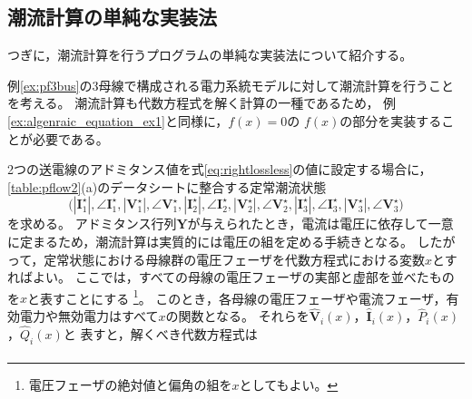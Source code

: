 \documentclass[tombow,dvipdfmx]{corona-a5-1.1}
\begin{document}
\subsection{潮流計算の単純な実装法}

つぎに，潮流計算を行うプログラムの単純な実装法について紹介する。
\begin{例}[潮流計算の実装法]\label{ex:simplepowerflow}
例\ref{ex:pf3bus}の3母線で構成される電力系統モデルに対して潮流計算を行うことを考える。
潮流計算も代数方程式を解く計算の一種であるため，
例\nobreak\ref{ex:algenraic_equation_ex1}と同様に，$f(x)=0$の
$f(x)$の部分を実装することが必要である。

2つの送電線のアドミタンス値を式\ref{eq:rightlossless}の値に設定する場合に，\ref{table:pflow2}(a)のデータシートに整合する定常潮流状態
\[
\bigl(
|\bm{I}_1^{\star}|,\angle \bm{I}_1^{\star},
|\bm{V}_1^{\star}|,\angle \bm{V}_1^{\star},
|\bm{I}_2^{\star}|,\angle \bm{I}_2^{\star},
|\bm{V}_2^{\star}|,\angle \bm{V}_2^{\star},
|\bm{I}_3^{\star}|,\angle \bm{I}_3^{\star},
|\bm{V}_3^{\star}|,\angle \bm{V}_3^{\star}
\bigr)
\]
を求める。
アドミタンス行列$\bm Y$が与えられたとき，電流は電圧に依存して一意に定まるため，潮流計算は実質的には電圧の組を定める手続きとなる。
したがって，定常状態における母線群の電圧フェーザを代数方程式における変数$x$とすればよい。
ここでは，すべての母線の電圧フェーザの実部と虚部を並べたものを$x$と表すことにする
\footnote{電圧フェーザの絶対値と偏角の組を$x$としてもよい。}。
このとき，各母線の電圧フェーザや電流フェーザ，有効電力や無効電力はすべて$x$の関数となる。
それらを$\hat{\bm V}_i(x)$，$\hat{\bm I}_i(x)$，$\hat{P}_i(x)$，$\hat{Q}_i(x)$と
表すと，解くべき代数方程式は
\begin{align*}

\end{align*}
\end{例}
\end{document}
